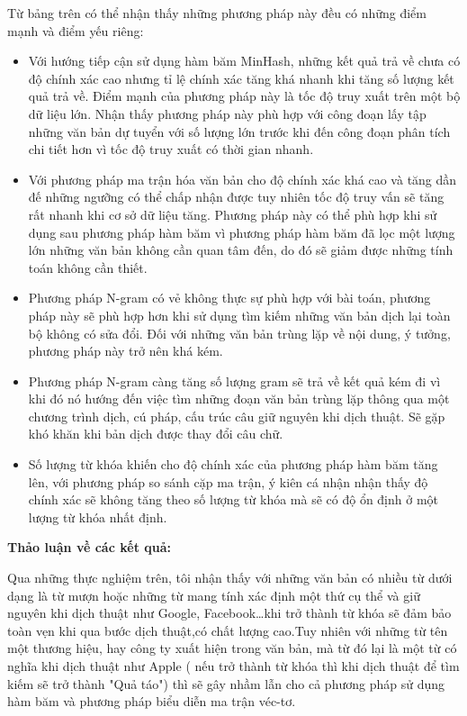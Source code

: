 \documentclass[12pt]{report}
\begin{document}
\newpage
Từ bảng trên có thể nhận thấy những phương pháp này đều có những điểm mạnh và điểm yếu riêng: 
\begin{itemize}
	\item Với hướng tiếp cận sử dụng hàm băm MinHash, những kết quả trả về chưa có độ chính xác cao nhưng tỉ lệ chính xác tăng khá nhanh khi tăng số lượng kết quả trả về. Điểm mạnh của phương pháp này là tốc độ truy xuất trên một bộ dữ liệu lớn. Nhận thấy phương pháp này phù hợp với công đoạn lấy tập những văn bản dự tuyển với số lượng lớn trước khi đến công đoạn phân tích chi tiết hơn vì tốc độ truy xuất có thời gian nhanh. 
	\item Với phương pháp ma trận hóa văn bản cho độ chính xác khá cao và tăng dần đế những ngưỡng có thể chấp nhận được tuy nhiên tốc độ truy vấn sẽ tăng rất nhanh khi cơ sở dữ liệu tăng. Phương pháp này có thể phù hợp khi sử dụng sau phương pháp hàm băm vì phương pháp hàm băm đã lọc một lượng lớn những văn bản không cần quan tâm đến, do đó sẽ giảm được những tính toán không cần thiết. 
	\item Phương pháp N-gram có vẻ không thực sự phù hợp với bài toán, phương pháp này sẽ phù hợp hơn khi sử dụng tìm kiếm những văn bản dịch lại toàn bộ không có sửa đổi. Đối với những văn bản trùng lặp về nội dung, ý tưởng, phương pháp này trở nên khá kém.
	\item Phương pháp N-gram càng tăng số lượng gram sẽ trả về kết quả kém đi vì khi đó nó hướng đến việc tìm những đoạn văn bản trùng lặp thông qua một chương trình dịch, cú pháp, cấu trúc câu giữ nguyên khi dịch thuật. Sẽ gặp khó khăn khi bản dịch được thay đổi câu chữ.
	\item Số lượng từ khóa khiến cho độ chính xác của phương pháp hàm băm tăng lên, với phương pháp so sánh cặp ma trận, ý kiên cá nhận nhận thấy độ chính xác sẽ không tăng theo số lượng từ khóa mà sẽ có độ ổn định ở một lượng từ khóa nhất định. 
\end{itemize}

\noindent\textbf{Thảo luận về các kết quả:}

Qua những thực nghiệm trên, tôi nhận thấy với những văn bản có nhiều từ dưới dạng là từ mượn hoặc những từ mang tính xác định một thứ cụ thể và giữ nguyên khi dịch thuật như Google, Facebook\dots khi trở thành từ khóa sẽ đảm bảo toàn vẹn khi qua bước dịch thuật,có chất lượng cao.Tuy nhiên với những từ tên một thương hiệu, hay công ty xuất hiện trong văn bản, mà từ đó lại là một từ có nghĩa khi dịch thuật như Apple ( nếu trở thành từ khóa thì khi dịch thuật để tìm kiếm sẽ trở thành "Quả táo") thì sẽ gây nhầm lẫn cho cả phương pháp sử dụng hàm băm và phương pháp biểu diễn ma trận véc-tơ.
\end{document}
